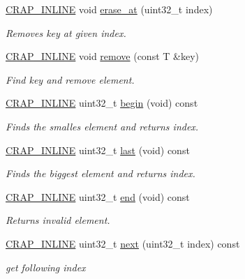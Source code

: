 \begin{DoxyCompactItemize}
\hyperlink{config__x86_8h_a5a40526b8d842e7ff731509998bb0f1c}{C\+R\+A\+P\+\_\+\+I\+N\+L\+I\+N\+E} void \hyperlink{classcrap_1_1tree_abfb24a2b155fa5e2715bc73abc1cc295}{erase\+\_\+at} (uint32\+\_\+t index)
\begin{DoxyCompactList}\small\item\em Removes key at given index. \end{DoxyCompactList}\item 
\hyperlink{config__x86_8h_a5a40526b8d842e7ff731509998bb0f1c}{C\+R\+A\+P\+\_\+\+I\+N\+L\+I\+N\+E} void \hyperlink{classcrap_1_1tree_ac0171b4666da775fb5325b82d3eccc24}{remove} (const T \&key)
\begin{DoxyCompactList}\small\item\em Find key and remove element. \end{DoxyCompactList}\item 
\hyperlink{config__x86_8h_a5a40526b8d842e7ff731509998bb0f1c}{C\+R\+A\+P\+\_\+\+I\+N\+L\+I\+N\+E} uint32\+\_\+t \hyperlink{classcrap_1_1tree_aaa6d5af3d6d87bf8be050d33898c6ee4}{begin} (void) const 
\begin{DoxyCompactList}\small\item\em Finds the smalles element and returns index. \end{DoxyCompactList}\item 
\hyperlink{config__x86_8h_a5a40526b8d842e7ff731509998bb0f1c}{C\+R\+A\+P\+\_\+\+I\+N\+L\+I\+N\+E} uint32\+\_\+t \hyperlink{classcrap_1_1tree_aa6874d39e991dfb43c095daa5937a2e4}{last} (void) const 
\begin{DoxyCompactList}\small\item\em Finds the biggest element and returns index. \end{DoxyCompactList}\item 
\hyperlink{config__x86_8h_a5a40526b8d842e7ff731509998bb0f1c}{C\+R\+A\+P\+\_\+\+I\+N\+L\+I\+N\+E} uint32\+\_\+t \hyperlink{classcrap_1_1tree_a9e18d90e547fe2c07a4625ccfb8cbd4d}{end} (void) const 
\begin{DoxyCompactList}\small\item\em Returns invalid element. \end{DoxyCompactList}\item 
\hyperlink{config__x86_8h_a5a40526b8d842e7ff731509998bb0f1c}{C\+R\+A\+P\+\_\+\+I\+N\+L\+I\+N\+E} uint32\+\_\+t \hyperlink{classcrap_1_1tree_a252cf850824ac3347b6d5ae78095f3ce}{next} (uint32\+\_\+t index) const 
\begin{DoxyCompactList}\small\item\em get following index \end{DoxyCompactList}\item 

\end{DoxyCompactItemize}
